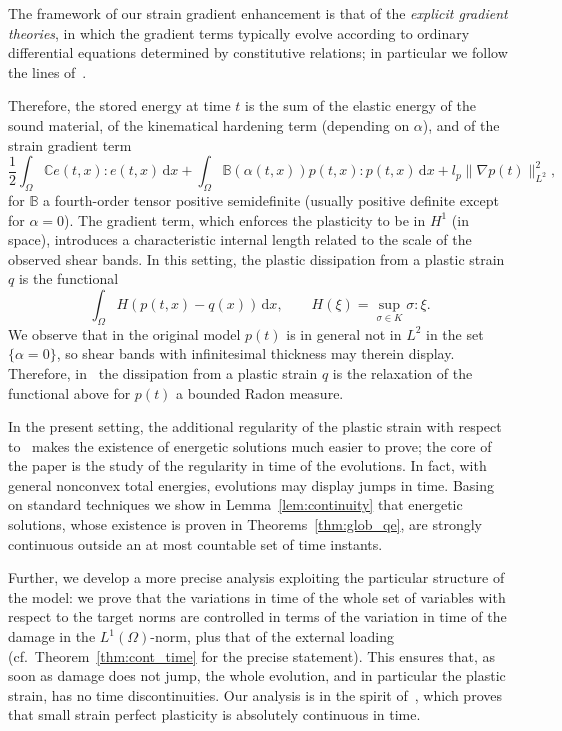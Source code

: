 \documentclass[reqno]{amsart}
\theoremstyle{definition}
\numberwithin{equation}{section}
\def\de {\mathrm{d}}
\def\C {\mathbb C}
\def\B {\mathbb B}
\begin{document}
The framework of our strain gradient enhancement is that of the \emph{explicit gradient theories}, in which the gradient terms typically evolve according to ordinary differential equations determined by constitutive relations; in particular we follow the lines of~\cite{FleHut01, Forest09, PohPeeGeeSwa11}. 

Therefore, the stored energy at time $t$ is the sum of the elastic energy of the sound material, of the kinematical hardening term (depending on $\alpha$), and of the strain gradient term
\begin{equation*}
\frac{1}{2}\int_{\Omega} \C e(t,x) : e(t,x) \,\de x + \int_\Omega \B(\alpha(t,x)) p(t,x) \colon p(t,x) \,\de x + l_p \|\nabla p(t)\|_{L^2}^2,
\end{equation*}
for $\B$ a fourth-order tensor positive semidefinite (usually positive definite except for $\alpha=0$). The gradient term, which enforces the plasticity to be in $H^1$ (in space), introduces a characteristic internal length related to the scale of the observed shear bands.  In this setting, the plastic dissipation from a plastic strain $q$ is the functional
$$\int_\Omega H(p(t,x)-q(x))\, \de x,\qquad H(\xi)=\sup_{\sigma\in K} \sigma \colon \xi.$$
We observe that in the original model $p(t)$ is in general not in $L^2$ in the set $\{\alpha=0\}$, so shear bands with infinitesimal thickness may therein display. Therefore, in~\cite{Cr3} the dissipation from a plastic strain $q$ is the relaxation of the functional above for $p(t)$ a  bounded Radon measure. 

In the present setting, the additional regularity of the plastic strain with respect to~\cite{Cr3} makes the existence of energetic solutions much easier to prove; the core of the paper is the study of the regularity in time of the evolutions.
In fact, with general nonconvex total energies, evolutions may display jumps in time. Basing on standard techniques we show in Lemma~\ref{lem:continuity} that energetic solutions, whose existence is proven in  Theorems~\ref{thm:glob_qe}, are strongly continuous outside an at most countable set of time instants.

Further, we develop a more precise analysis exploiting the particular structure of the model: we prove that the variations in time of the whole set of variables with respect to the target norms are controlled in terms of the variation in time of the damage in the $L^1(\Omega)$-norm, plus that of the external loading (cf.\ Theorem~\ref{thm:cont_time} for the precise statement). This ensures that, as soon as damage does not jump, the whole evolution, and in particular the plastic strain, has no time discontinuities.
Our analysis is in the spirit of~\cite{DMDSMo}, which proves that small strain perfect plasticity is absolutely continuous in time.
\end{document}
